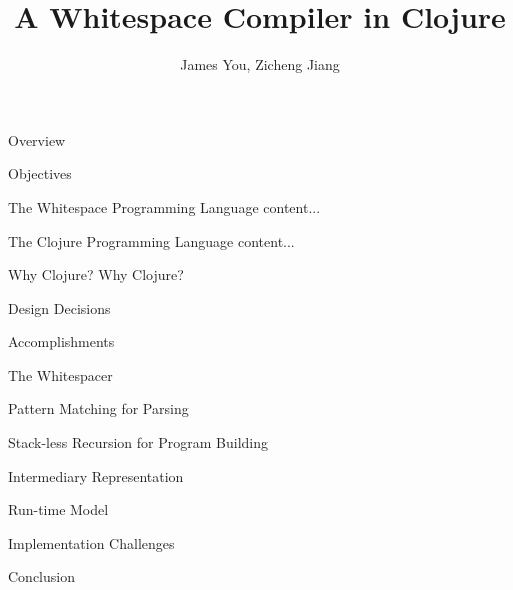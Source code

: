 \documentclass{beamer}
\title{A Whitespace Compiler in Clojure}
\author{James You, Zicheng Jiang}
\begin{document}
\maketitle

\begin{frame}{Overview}

\end{frame}

\begin{frame}{Objectives}

\end{frame}

\begin{frame}{The Whitespace Programming Language}
content...
\end{frame}

\begin{frame}{The Clojure Programming Language}
content...
\end{frame}

\begin{frame}{Why Clojure?}
Why Clojure?
\end{frame}

\begin{frame}{Design Decisions}

\end{frame}

\begin{frame}{Accomplishments}

\end{frame}

\begin{frame}{The Whitespacer}
	
\end{frame}

\begin{frame}{Pattern Matching for Parsing}

\end{frame}

\begin{frame}{Stack-less Recursion for Program Building}

\end{frame} 
\begin{frame}{Intermediary Representation}

\end{frame}

\begin{frame}{Run-time Model}

\end{frame}

\begin{frame}{Implementation Challenges}

\end{frame}

\begin{frame}{Conclusion}

\end{frame}
\end{document}
